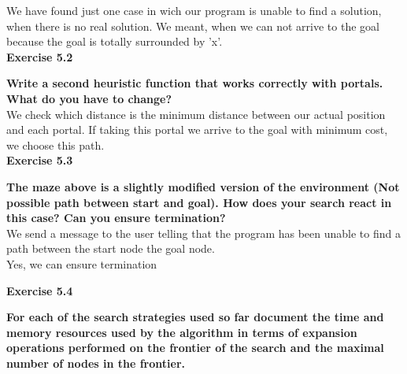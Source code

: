 \documentclass[paper=a4, fontsize=11pt]{scrartcl} %
\numberwithin{equation}{section} %
\numberwithin{figure}{section} %
\numberwithin{table}{section} %
\begin{document}
We have found just one case in wich our program is unable to find a solution, when there is no real solution. We meant, when we can not arrive to the goal because the goal is totally surrounded by 'x'.\\



\huge{ \textbf{Exercise 5.2}}
\newline

\large{\textbf{Write a second heuristic function that works correctly with portals. What do you have to change?}}\\

We check which distance is the minimum distance between our actual position and each portal. If taking this portal we arrive to the goal with minimum cost, we choose this path.\\





\huge{ \textbf{Exercise 5.3}}
\newline

\large{\textbf{The maze above is a slightly modified version of the environment (Not possible path between start and goal). How does your search react in this case? Can you ensure termination?}}\\

We send a message to the user telling that the program has been unable to find a path between the start node the goal node.\\
Yes, we can ensure termination






\newpage


\huge{ \textbf{Exercise 5.4}}
\newline

\large{\textbf{For each of the search strategies used so far document the time and memory resources used by the algorithm in terms of expansion operations performed on the frontier of the search and the maximal number of nodes in the frontier.}}





\newpage

\end{document}
